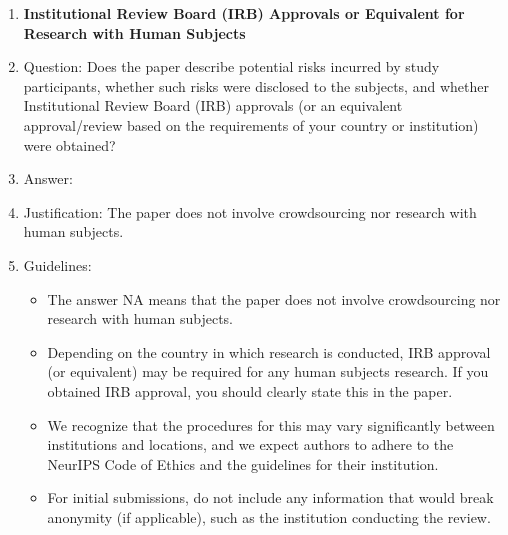 \documentclass{article}
\begin{document}
\begin{enumerate}
\item {\bf Institutional Review Board (IRB) Approvals or Equivalent for Research with Human Subjects}
    \item[] Question: Does the paper describe potential risks incurred by study participants, whether such risks were disclosed to the subjects, and whether Institutional Review Board (IRB) approvals (or an equivalent approval/review based on the requirements of your country or institution) were obtained?
    \item[] Answer: \answerNA{} %
    \item[] Justification: The paper does not involve crowdsourcing nor research with human subjects.
    \item[] Guidelines:
    \begin{itemize}
        \item The answer NA means that the paper does not involve crowdsourcing nor research with human subjects.
        \item Depending on the country in which research is conducted, IRB approval (or equivalent) may be required for any human subjects research. If you obtained IRB approval, you should clearly state this in the paper. 
        \item We recognize that the procedures for this may vary significantly between institutions and locations, and we expect authors to adhere to the NeurIPS Code of Ethics and the guidelines for their institution. 
        \item For initial submissions, do not include any information that would break anonymity (if applicable), such as the institution conducting the review.
    \end{itemize}

\end{enumerate}
\end{document}
